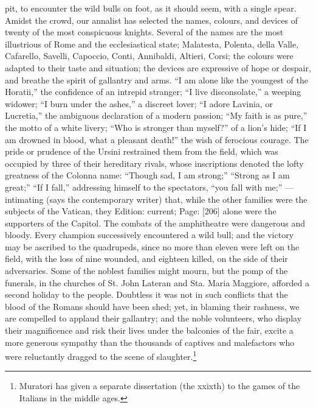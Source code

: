 pit, to encounter the wild bulls on foot, as it should seem, with a single spear. Amidst the crowd, our annalist has selected the names, colours, and devices of twenty of the most conspicuous knights. Several of the names are the most illustrious of Rome and the ecclesiastical state; Malatesta, Polenta, della Valle, Cafarello, Savelli, Capoccio, Conti, Annibaldi, Altieri, Corsi; the colours were adapted to their taste and situation; the devices are expressive of hope or despair, and breathe the spirit of gallantry and arms. \texthebrew{“}I am alone like the youngest of the Horatii,\texthebrew{}” the confidence of an intrepid stranger; \texthebrew{“}I live disconsolate,\texthebrew{}” a weeping widower; \texthebrew{“}I burn under the ashes,\texthebrew{}” a discreet lover; \texthebrew{“}I adore Lavinia, or Lucretia,\texthebrew{}” the ambiguous declaration of a modern passion; \texthebrew{“}My faith is as pure,\texthebrew{}” the motto of a white livery; \texthebrew{“}Who is stronger than myself?\texthebrew{}” of a lion\texthebrew{}’s hide; \texthebrew{“}If I am drowned in blood, what a pleasant death!\texthebrew{}” the wish of ferocious courage. The pride or prudence of the Ursini restrained them from the field, which was occupied by three of their hereditary rivals, whose inscriptions denoted the lofty greatness of the Colonna name: \texthebrew{“}Though sad, I am strong;\texthebrew{” “}Strong as I am great;\texthebrew{” “}If I fall,\texthebrew{}” addressing himself to the spectators, \texthebrew{“}you fall with me;\texthebrew{” —} intimating (says the contemporary writer) that, while the other families were the subjects of the Vatican, they Edition: current; Page: [206] alone were the supporters of the Capitol. The combats of the amphitheatre were dangerous and bloody. Every champion successively encountered a wild bull; and the victory may be ascribed to the quadrupeds, since no more than eleven were left on the field, with the loss of nine wounded, and eighteen killed, on the side of their adversaries. Some of the noblest families might mourn, but the pomp of the funerals, in the churches of St. John Lateran and Sta. Maria Maggiore, afforded a second holiday to the people. Doubtless it was not in such conflicts that the blood of the Romans should have been shed; yet, in blaming their rashness, we are compelled to applaud their gallantry; and the noble volunteers, who display their magnificence and risk their lives under the balconies of the fair, excite a more generous sympathy than the thousands of captives and malefactors who were reluctantly dragged to the scene of slaughter.\footnote{Muratori has given a separate dissertation (the xxixth) to the games of the Italians in the middle ages.}

